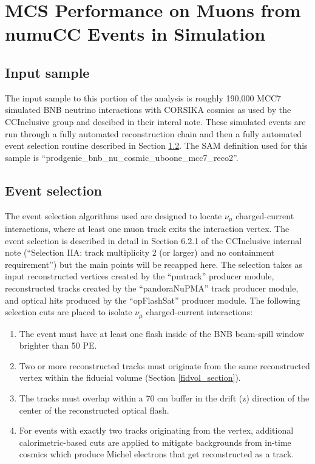 \section{MCS Performance on Muons from numuCC Events in Simulation}\label{MC_performance_section}

\subsection{Input sample}\label{MC_BNB_input_sample_section}
The input sample to this portion of the analysis is roughly 190,000 MCC7 simulated BNB neutrino interactions with CORSIKA cosmics as used by the CCInclusive group and descibed in their interal note\cite{CCIncInternalNote}. These simulated events are run through a fully automated reconstruction chain and then a fully automated event selection routine described in Section \ref{MC_BNB_eventselection_section}. The SAM definition used for this sample is ``prodgenie\_bnb\_nu\_cosmic\_uboone\_mcc7\_reco2''.

\subsection{Event selection}\label{MC_BNB_eventselection_section}
The event selection algorithms used are designed to locate $\nu_\mu$ charged-current interactions, where at least one muon track exits the interaction vertex. The event selection is described in detail in Section 6.2.1 of the {\ub} CCInclusive internal note\cite{CCIncInternalNote} (``Selection IIA: track multiplicity 2 (or larger) and no containment requirement'') but the main points will be recapped here. The selection takes as input reconstructed vertices created by the ``pmtrack'' producer module, reconstructed tracks created by the ``pandoraNuPMA'' track producer module, and optical hits produced by the ``opFlashSat'' producer module. The following selection cuts are placed to isolate $\nu_\mu$ charged-current interactions:
\begin{enumerate}
\item The event must have at least one flash inside of the BNB beam-spill window brighter than 50 PE.
\item Two or more reconstructed tracks must originate from the same reconstructed vertex within the fiducial volume (Section \ref{fidvol_section}).
\item The tracks must overlap within a 70 cm buffer in the drift (z) direction of the center of the reconstructed optical flash.
\item For events with exactly two tracks originating from the vertex, additional calorimetric-based cuts are applied to mitigate backgrounds from in-time cosmics which produce Michel electrons that get reconstructed as a track.
\end{enumerate}

